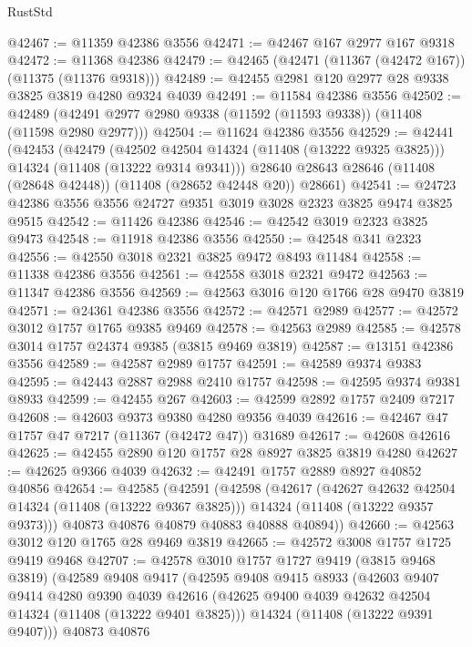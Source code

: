 \begin{lexlean}{RustStd}
\begin{coremodule}
@42467 := @11359 @42386 @3556
@42471 := @42467 @167 @2977 @167 @9318
@42472 := @11368 @42386
@42479 := @42465 (@42471 (@11367 (@42472 @167)) (@11375 (@11376 @9318)))
@42489 := @42455 @2981 @120 @2977 @28 @9338 @3825 @3819 @4280 @9324 @4039
@42491 := @11584 @42386 @3556
@42502 := @42489 (@42491 @2977 @2980 @9338 (@11592 (@11593 @9338)) (@11408 (@11598 @2980 @2977)))
@42504 := @11624 @42386 @3556
@42529 := @42441
    (@42453
      (@42479
        (@42502 @42504 @14324 (@11408 (@13222 @9325 @3825)))
        @14324
        (@11408 (@13222 @9314 @9341)))
      @28640
      @28643
      @28646
      (@11408 (@28648 @42448))
      (@11408 (@28652 @42448 @20))
      @28661)
@42541 := @24723 @42386 @3556 @3556 @24727 @9351 @3019 @3028 @2323 @3825 @9474 @3825 @9515
@42542 := @11426 @42386
@42546 := @42542 @3019 @2323 @3825 @9473
@42548 := @11918 @42386 @3556
@42550 := @42548 @341 @2323
@42556 := @42550 @3018 @2321 @3825 @9472 @8493 @11484
@42558 := @11338 @42386 @3556
@42561 := @42558 @3018 @2321 @9472
@42563 := @11347 @42386 @3556
@42569 := @42563 @3016 @120 @1766 @28 @9470 @3819
@42571 := @24361 @42386 @3556
@42572 := @42571 @2989
@42577 := @42572 @3012 @1757 @1765 @9385 @9469
@42578 := @42563 @2989
@42585 := @42578 @3014 @1757 @24374 @9385 (@3815 @9469 @3819)
@42587 := @13151 @42386 @3556
@42589 := @42587 @2989 @1757
@42591 := @42589 @9374 @9383
@42595 := @42443 @2887 @2988 @2410 @1757
@42598 := @42595 @9374 @9381 @8933
@42599 := @42455 @267
@42603 := @42599 @2892 @1757 @2409 @7217
@42608 := @42603 @9373 @9380 @4280 @9356 @4039
@42616 := @42467 @47 @1757 @47 @7217 (@11367 (@42472 @47)) @31689
@42617 := @42608 @42616
@42625 := @42455 @2890 @120 @1757 @28 @8927 @3825 @3819 @4280
@42627 := @42625 @9366 @4039
@42632 := @42491 @1757 @2889 @8927 @40852 @40856
@42654 := @42585
    (@42591
      (@42598
        (@42617
          (@42627 @42632 @42504 @14324 (@11408 (@13222 @9367 @3825)))
          @14324
          (@11408 (@13222 @9357 @9373)))
        @40873
        @40876
        @40879
        @40883
        @40888
        @40894))
@42660 := @42563 @3012 @120 @1765 @28 @9469 @3819
@42665 := @42572 @3008 @1757 @1725 @9419 @9468
@42707 := @42578
    @3010
    @1757
    @1727
    @9419
    (@3815 @9468 @3819)
    (@42589
      @9408
      @9417
      (@42595
        @9408
        @9415
        @8933
        (@42603
          @9407
          @9414
          @4280
          @9390
          @4039
          @42616
          (@42625 @9400 @4039 @42632 @42504 @14324 (@11408 (@13222 @9401 @3825)))
          @14324
          (@11408 (@13222 @9391 @9407)))
        @40873
        @40876

\end{coremodule}
\end{lexlean}
